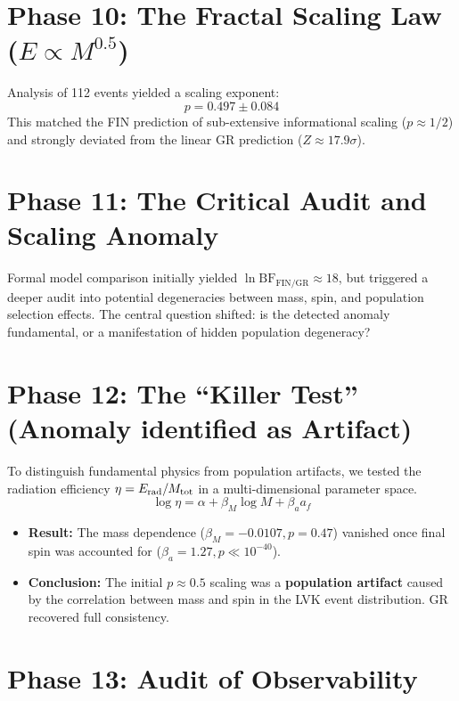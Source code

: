 \documentclass[11pt,a4paper]{book}
\theoremstyle{remark}
\begin{document}
\section{Phase 10: The Fractal Scaling Law ($E \propto M^{0.5}$)}

Analysis of 112 events yielded a scaling exponent:
\begin{equation}
    p = 0.497 \pm 0.084
\end{equation}
This matched the FIN prediction of sub-extensive informational scaling ($p \approx 1/2$) and strongly deviated from the linear GR prediction ($Z \approx 17.9\sigma$).

\section{Phase 11: The Critical Audit and Scaling Anomaly}

Formal model comparison initially yielded $\ln \text{BF}_{\text{FIN/GR}} \approx 18$, but triggered a deeper audit into potential degeneracies between mass, spin, and population selection effects. The central question shifted: is the detected anomaly fundamental, or a manifestation of hidden population degeneracy?

\section{Phase 12: The ``Killer Test'' (Anomaly identified as Artifact)}

To distinguish fundamental physics from population artifacts, we tested the radiation efficiency $\eta = E_{\rm rad}/M_{\rm tot}$ in a multi-dimensional parameter space.
\begin{equation}
    \log \eta = \alpha + \beta_M \log M + \beta_a a_f
\end{equation}
\begin{itemize}
    \item \textbf{Result:} The mass dependence ($\beta_M = -0.0107, p = 0.47$) vanished once final spin was accounted for ($\beta_a = 1.27, p \ll 10^{-40}$).
    \item \textbf{Conclusion:} The initial $p \approx 0.5$ scaling was a \textbf{population artifact} caused by the correlation between mass and spin in the LVK event distribution. GR recovered full consistency.
\end{itemize}

\section{Phase 13: Audit of Observability}
\end{document}
